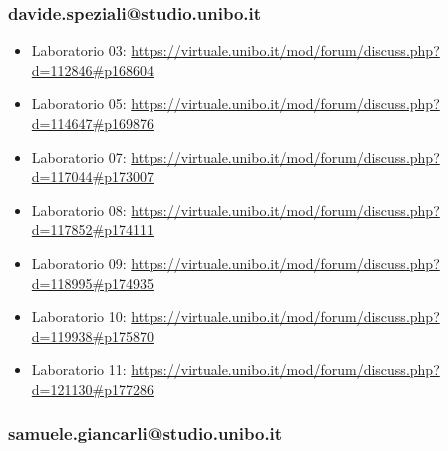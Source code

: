 \subsubsection*{davide.speziali@studio.unibo.it}
\begin{itemize}
    \item Laboratorio 03: \url{https://virtuale.unibo.it/mod/forum/discuss.php?d=112846#p168604}
    \item Laboratorio 05: \url{https://virtuale.unibo.it/mod/forum/discuss.php?d=114647#p169876}
    \item Laboratorio 07: \url{https://virtuale.unibo.it/mod/forum/discuss.php?d=117044#p173007}
    \item Laboratorio 08: \url{https://virtuale.unibo.it/mod/forum/discuss.php?d=117852#p174111}
    \item Laboratorio 09: \url{https://virtuale.unibo.it/mod/forum/discuss.php?d=118995#p174935}
    \item Laboratorio 10: \url{https://virtuale.unibo.it/mod/forum/discuss.php?d=119938#p175870}
    \item Laboratorio 11: \url{https://virtuale.unibo.it/mod/forum/discuss.php?d=121130#p177286}
\end{itemize}

\subsubsection*{samuele.giancarli@studio.unibo.it}